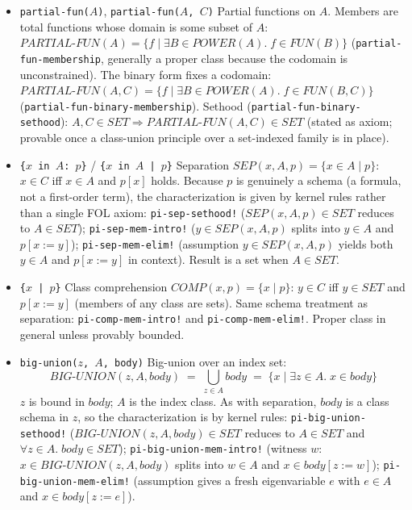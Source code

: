 \begin{itemize}
\item \texttt{partial-fun($A$)}, \texttt{partial-fun($A$, $C$)}
  Partial functions on $A$.  Members are total functions whose domain
  is some subset of $A$:
  $\mathit{PARTIAL\text{-}FUN}(A) = \{f \mid \exists B \in \mathit{POWER}(A).
   \; f \in \mathit{FUN}(B)\}$
  (\texttt{partial-fun-membership}, generally a proper class because
  the codomain is unconstrained).  The binary form fixes a codomain:
  $\mathit{PARTIAL\text{-}FUN}(A, C) = \{f \mid \exists B \in \mathit{POWER}(A).
   \; f \in \mathit{FUN}(B, C)\}$
  (\texttt{partial-fun-binary-membership}).  Sethood
  (\texttt{partial-fun-binary-sethood}):
  $A, C \in \mathit{SET} \Rightarrow \mathit{PARTIAL\text{-}FUN}(A, C)
   \in \mathit{SET}$ (stated as axiom; provable once a class-union
  principle over a set-indexed family is in place).

\item \texttt{\{$x$ in $A$: $p$\}} / \texttt{\{$x$ in $A$ | $p$\}}
  Separation $\mathit{SEP}(x, A, p) = \{x \in A \mid p\}$: $x \in C$
  iff $x \in A$ and $p[x]$ holds.  Because $p$ is genuinely a schema
  (a formula, not a first-order term), the characterization is given
  by kernel rules rather than a single FOL axiom:
  \texttt{pi-sep-sethood!} ($\mathit{SEP}(x, A, p) \in \mathit{SET}$
  reduces to $A \in \mathit{SET}$);
  \texttt{pi-sep-mem-intro!} ($y \in \mathit{SEP}(x, A, p)$ splits
  into $y \in A$ and $p[x:=y]$);
  \texttt{pi-sep-mem-elim!} (assumption $y \in \mathit{SEP}(x, A, p)$
  yields both $y \in A$ and $p[x:=y]$ in context).
  Result is a set when $A \in \mathit{SET}$.

\item \texttt{\{$x$ | $p$\}}
  Class comprehension $\mathit{COMP}(x, p) = \{x \mid p\}$: $y \in C$
  iff $y \in \mathit{SET}$ and $p[x:=y]$ (members of any class are
  sets).  Same schema treatment as separation:
  \texttt{pi-comp-mem-intro!} and \texttt{pi-comp-mem-elim!}.
  Proper class in general unless provably bounded.

\item \texttt{big-union($z$, $A$, body)}
  Big-union over an index set:
  \[
    \mathit{BIG\text{-}UNION}(z, A, \mathit{body})
    \;=\; \bigcup_{z \in A} \mathit{body}
    \;=\; \{x \mid \exists z \in A.\; x \in \mathit{body}\}
  \]
  $z$ is bound in $\mathit{body}$; $A$ is the index class.
  As with separation, $\mathit{body}$ is a class schema in $z$, so the
  characterization is by kernel rules:
  \texttt{pi-big-union-sethood!}
  ($\mathit{BIG\text{-}UNION}(z, A, \mathit{body}) \in \mathit{SET}$
   reduces to $A \in \mathit{SET}$ and
   $\forall z \in A.\; \mathit{body} \in \mathit{SET}$);
  \texttt{pi-big-union-mem-intro!} (witness $w$:
   $x \in \mathit{BIG\text{-}UNION}(z, A, \mathit{body})$ splits into
   $w \in A$ and $x \in \mathit{body}[z := w]$);
  \texttt{pi-big-union-mem-elim!} (assumption gives a fresh
   eigenvariable $e$ with $e \in A$ and $x \in \mathit{body}[z := e]$).


\end{itemize}
